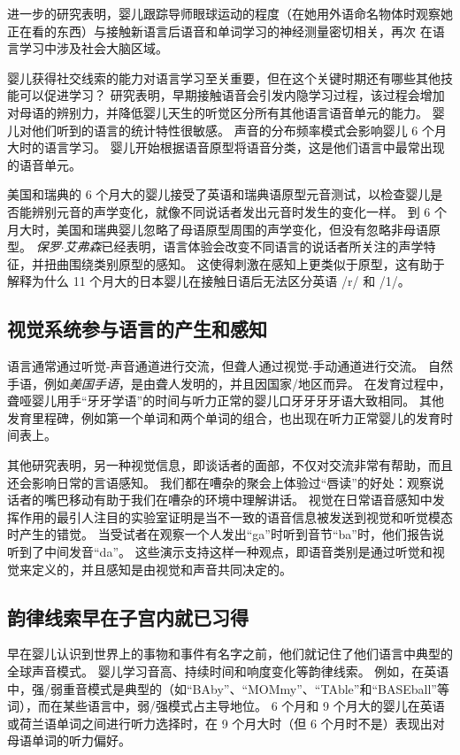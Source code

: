 进一步的研究表明，婴儿跟踪导师眼球运动的程度（在她用外语命名物体时观察她正在看的东西）与接触新语言后语音和单词学习的神经测量密切相关，再次 在语言学习中涉及社会大脑区域。


婴儿获得社交线索的能力对语言学习至关重要，但在这个关键时期还有哪些其他技能可以促进学习？
研究表明，早期接触语音会引发内隐学习过程，该过程会增加对母语的辨别力，并降低婴儿天生的听觉区分所有其他语言语音单元的能力。
婴儿对他们听到的语言的统计特性很敏感。
声音的分布频率模式会影响婴儿 6 个月大时的语言学习。
婴儿开始根据语音原型将语音分类，这是他们语言中最常出现的语音单元。


美国和瑞典的 6 个月大的婴儿接受了英语和瑞典语原型元音测试，以检查婴儿是否能辨别元音的声学变化，就像不同说话者发出元音时发生的变化一样。
到 6 个月大时，美国和瑞典婴儿忽略了母语原型周围的声学变化，但没有忽略非母语原型。
\textit{保罗$\cdot$艾弗森}已经表明，语言体验会改变不同语言的说话者所关注的声学特征，并扭曲围绕类别原型的感知。
这使得刺激在感知上更类似于原型，这有助于解释为什么 11 个月大的日本婴儿在接触日语后无法区分英语 /r/ 和 /1/。



\subsection{视觉系统参与语言的产生和感知}

语言通常通过听觉-声音通道进行交流，但聋人通过视觉-手动通道进行交流。
自然手语，例如\textit{美国手语}，是由聋人发明的，并且因国家/地区而异。
在发育过程中，聋哑婴儿用手“牙牙学语”的时间与听力正常的婴儿口牙牙牙牙语大致相同。
其他发育里程碑，例如第一个单词和两个单词的组合，也出现在听力正常婴儿的发育时间表上。


其他研究表明，另一种视觉信息，即谈话者的面部，不仅对交流非常有帮助，而且还会影响日常的言语感知。
我们都在嘈杂的聚会上体验过“唇读”的好处：观察说话者的嘴巴移动有助于我们在嘈杂的环境中理解讲话。
视觉在日常语音感知中发挥作用的最引人注目的实验室证明是当不一致的语音信息被发送到视觉和听觉模态时产生的错觉。
当受试者在观察一个人发出“ga”时听到音节“ba”时，他们报告说听到了中间发音“da”。
这些演示支持这样一种观点，即语音类别是通过听觉和视觉来定义的，并且感知是由视觉和声音共同决定的。



\subsection{韵律线索早在子宫内就已习得}

早在婴儿认识到世界上的事物和事件有名字之前，他们就记住了他们语言中典型的全球声音模式。
婴儿学习音高、持续时间和响度变化等韵律线索。
例如，在英语中，强/弱重音模式是典型的（如“BAby”、“MOMmy”、“TAble”和“BASEball”等词），而在某些语言中，弱/强模式占主导地位。
6 个月和 9 个月大的婴儿在英语或荷兰语单词之间进行听力选择时，在 9 个月大时（但 6 个月时不是）表现出对母语单词的听力偏好。


